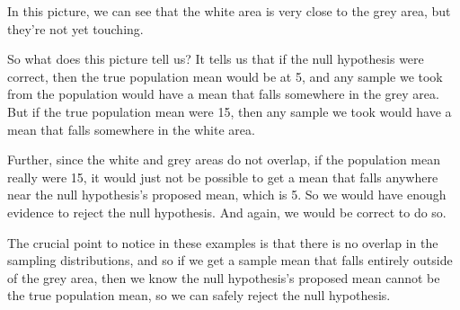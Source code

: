 \documentclass[../../../main.tex]{subfiles}
\begin{document}
\begin{center}
\end{center}

\noindent
In this picture, we can see that the white area is very close to the grey area, but they're not yet touching. 

So what does this picture tell us? It tells us that if the null hypothesis were correct, then the true population mean would be at 5, and any sample we took from the population would have a mean that falls somewhere in the grey area. But if the true population mean were 15, then any sample we took would have a mean that falls somewhere in the white area. 

Further, since the white and grey areas do not overlap, if the population mean really were 15, it would just not be possible to get a mean that falls anywhere near the null hypothesis's proposed mean, which is 5. So we would have enough evidence to reject the null hypothesis. And again, we would be correct to do so.

The crucial point to notice in these examples is that there is no overlap in the sampling distributions, and so if we get a sample mean that falls entirely outside of the grey area, then we know the null hypothesis's proposed mean cannot be the true population mean, so we can safely reject the null hypothesis. 
\end{document}
